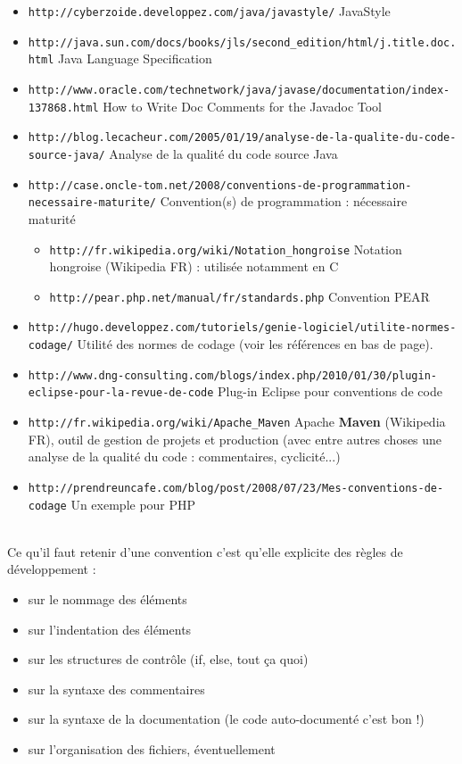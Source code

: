\documentclass[11pt,twoside,a4paper]{article}
\begin{document}
\begin{itemize}
	\item[] \texttt{http://cyberzoide.developpez.com/java/javastyle/} JavaStyle 
	\item[] \texttt{http://java.sun.com/docs/books/jls/second\_edition/html/j.title.doc.html} Java Language Specification
	\item[] \texttt{http://www.oracle.com/technetwork/java/javase/documentation/index-137868.html} How to Write Doc Comments for the Javadoc Tool 
	\item[] \texttt{http://blog.lecacheur.com/2005/01/19/analyse-de-la-qualite-du-code-source-java/} Analyse de la qualit{\'e} du code source Java
	\item[] \texttt{http://case.oncle-tom.net/2008/conventions-de-programmation-necessaire-maturite/} Convention(s) de programmation : n{\'e}cessaire maturit{\'e}
	\begin{itemize}
		\item[] \texttt{http://fr.wikipedia.org/wiki/Notation\_hongroise} Notation hongroise (Wikipedia FR) : utilis{\'e}e notamment en C
		\item[] \texttt{http://pear.php.net/manual/fr/standards.php} Convention PEAR
	\end{itemize}
	\item[] \texttt{http://hugo.developpez.com/tutoriels/genie-logiciel/utilite-normes-codage/} Utilit{\'e} des normes de codage (voir les r{\'e}f{\'e}rences en bas de page). 
	\item[] \texttt{http://www.dng-consulting.com/blogs/index.php/2010/01/30/plugin-eclipse-pour-la-revue-de-code} Plug-in Eclipse pour conventions de code
	\item[] \texttt{http://fr.wikipedia.org/wiki/Apache\_Maven} Apache \textbf{Maven} (Wikipedia FR), outil de gestion de projets et production (avec entre autres choses une analyse de la qualit{\'e} du code : commentaires, cyclicit{\'e}...)
	\item[] \texttt{http://prendreuncafe.com/blog/post/2008/07/23/Mes-conventions-de-codage} Un exemple pour PHP
\end{itemize}~\\

Ce qu'il faut retenir d'une convention c'est qu'elle explicite des r{\`e}gles de d{\'e}veloppement :
\begin{itemize}
	\item[] sur le nommage des {\'e}l{\'e}ments
    \item[] sur l'indentation des {\'e}l{\'e}ments
    \item[] sur les structures de contr{\^o}le (if, else, tout \c{c}a quoi)
    \item[] sur la syntaxe des commentaires
    \item[] sur la syntaxe de la documentation (le code auto-document{\'e} c'est bon !)
    \item[] sur l'organisation des fichiers, {\'e}ventuellement
\end{itemize}~\\
\end{document}
